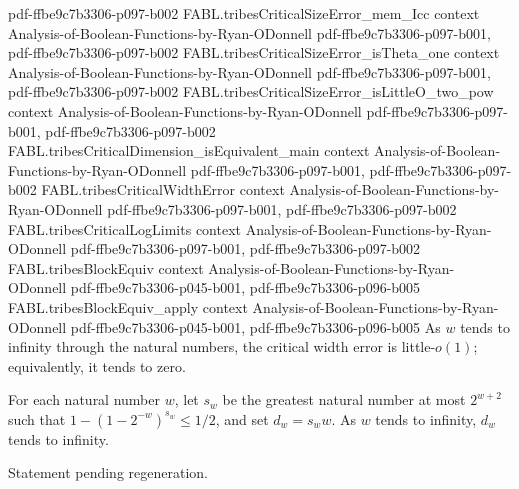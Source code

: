 \begin{theorem}
  {pdf-ffbe9c7b3306-p097-b002}
\proofstep
  {FABL.tribesCriticalSizeError_mem_Icc}
  {context}
  {Analysis-of-Boolean-Functions-by-Ryan-ODonnell}
  {pdf-ffbe9c7b3306-p097-b001,
    pdf-ffbe9c7b3306-p097-b002}
\proofstep
  {FABL.tribesCriticalSizeError_isTheta_one}
  {context}
  {Analysis-of-Boolean-Functions-by-Ryan-ODonnell}
  {pdf-ffbe9c7b3306-p097-b001,
    pdf-ffbe9c7b3306-p097-b002}
\proofstep
  {FABL.tribesCriticalSizeError_isLittleO_two_pow}
  {context}
  {Analysis-of-Boolean-Functions-by-Ryan-ODonnell}
  {pdf-ffbe9c7b3306-p097-b001,
    pdf-ffbe9c7b3306-p097-b002}
\proofstep
  {FABL.tribesCriticalDimension_isEquivalent_main}
  {context}
  {Analysis-of-Boolean-Functions-by-Ryan-ODonnell}
  {pdf-ffbe9c7b3306-p097-b001,
    pdf-ffbe9c7b3306-p097-b002}
\proofstep
  {FABL.tribesCriticalWidthError}
  {context}
  {Analysis-of-Boolean-Functions-by-Ryan-ODonnell}
  {pdf-ffbe9c7b3306-p097-b001,
    pdf-ffbe9c7b3306-p097-b002}
\proofstep
  {FABL.tribesCriticalLogLimits}
  {context}
  {Analysis-of-Boolean-Functions-by-Ryan-ODonnell}
  {pdf-ffbe9c7b3306-p097-b001,
    pdf-ffbe9c7b3306-p097-b002}
\proofstep
  {FABL.tribesBlockEquiv}
  {context}
  {Analysis-of-Boolean-Functions-by-Ryan-ODonnell}
  {pdf-ffbe9c7b3306-p045-b001,
    pdf-ffbe9c7b3306-p096-b005}
\proofstep
  {FABL.tribesBlockEquiv_apply}
  {context}
  {Analysis-of-Boolean-Functions-by-Ryan-ODonnell}
  {pdf-ffbe9c7b3306-p045-b001,
    pdf-ffbe9c7b3306-p096-b005}
As $w$ tends to infinity through the natural numbers, the critical width error is
little-$o(1)$; equivalently, it tends to zero.
\end{theorem}

\begin{theorem}
\label{FABL.tendsto_tribesCriticalDimension_atTop}
\leanok
{}
For each natural number $w$, let $s_w$ be the greatest natural number at most $2^{w+2}$
such that $1-(1-2^{-w})^{s_w}\le 1/2$, and set $d_w=s_w w$. As $w$ tends to infinity,
$d_w$ tends to infinity.
\end{theorem}

\begin{theorem}
\label{FABL.tendsto_two_pow_mul_log_tribesCriticalDimension_div}
\leanok
{}
Statement pending regeneration.
\end{theorem}

